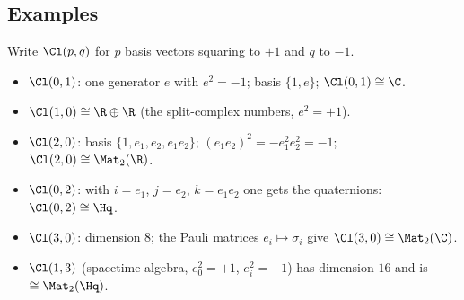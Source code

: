 \subsection{Examples}

\begin{example} Write $\Cl(p,q)$ for $p$ basis vectors squaring to $+1$ and $q$ to $-1$.
\begin{itemize}
  \item $\Cl(0,1)$: one generator $e$ with $e^2=-1$; basis $\{1,e\}$; $\Cl(0,1)\cong\C$.
  \item $\Cl(1,0)\cong\R\oplus\R$ (the split-complex numbers, $e^2=+1$).
  \item $\Cl(2,0)$: basis $\{1,e_1,e_2,e_1e_2\}$; $(e_1e_2)^2=-e_1^2e_2^2=-1$; $\Cl(2,0)\cong\Mat_2(\R)$.
  \item $\Cl(0,2)$: with $i=e_1$, $j=e_2$, $k=e_1e_2$ one gets the quaternions: $\Cl(0,2)\cong\Hq$.
  \item $\Cl(3,0)$: dimension $8$; the Pauli matrices $e_i\mapsto\sigma_i$ give $\Cl(3,0)\cong\Mat_2(\C)$.
  \item $\Cl(1,3)$ (spacetime algebra, $e_0^2=+1$, $e_i^2=-1$) has dimension $16$ and is $\cong\Mat_2(\Hq)$.
\end{itemize}
\end{example}
